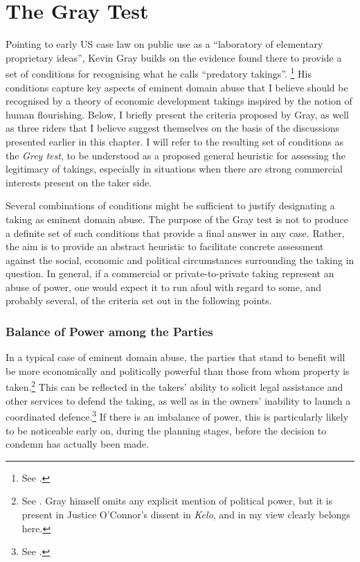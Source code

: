 \section{The Gray Test}\label{sec:gt}

Pointing to early US case law on public use as a ``laboratory of elementary proprietary ideas'', Kevin Gray builds on the evidence found there to provide a set of conditions for recognising what he calls ``predatory takings''. \footnote{See \cite[28-30]{gray11}.} His conditions capture key aspects of eminent domain abuse that I believe should be recognised by a theory of economic development takings inspired by the notion of human flourishing. Below, I briefly present the criteria proposed by Gray, as well as three riders that I believe suggest themselves on the basis of the discussions presented earlier in this chapter. I will refer to the resulting set of conditions as the {\it Grey test}, to be understood as a proposed general heuristic for assessing the legitimacy of takings, especially in situations when there are strong commercial interests present on the taker side. %

Several combinations of conditions might be sufficient to justify designating a taking as eminent domain abuse. The purpose of the Gray test is not to produce a definite set of such conditions that provide a final answer in any case. Rather, the aim is to provide an abstract heuristic to facilitate concrete assessment against the social, economic and political circumstances surrounding the taking in question. In general, if a commercial or private-to-private taking represent an abuse of power, one would expect it to run afoul with regard to some, and probably several, of the criteria set out in the following points.

\subsubsection*{Balance of Power among the Parties}

In a typical case of eminent domain abuse, the parties that stand to benefit will be more economically and politically powerful than those from whom property is taken.\footnote{See \cite[30-31]{gray11}. Gray himself omits any explicit mention of political power, but it is present in Justice O'Connor's dissent in {\it Kelo}, and in my view clearly belongs here.} This can be reflected in the takers' ability to solicit legal assistance and other services to defend the taking, as well as in the  owners' inability to launch a coordinated defence.\footnote{See \cite[30-31]{gray11}.} If there is an imbalance of power, this is particularly likely to be noticeable early on, during the planning stages, before the decision to condemn has actually been made. 


